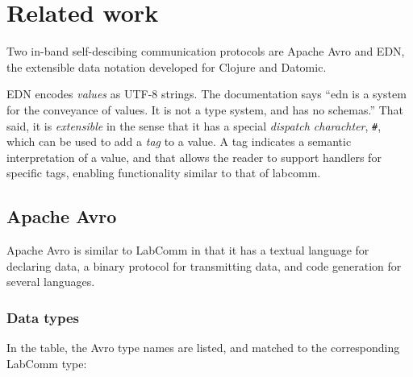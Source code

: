 \documentclass[a4paper]{article}
\begin{document}
\section{Related work}
  
Two in-band self-descibing communication protocols are Apache
Avro\cite{avro} and EDN, the extensible data notation developed for
Clojure and Datomic\cite{EDN}.

EDN encodes \emph{values} as UTF-8 strings. The documentation says
``edn is a system for the conveyance of values. It is not a type system,
and has no schemas.'' That said, it is \emph{extensible} in the sense
that it has a special \emph{dispatch charachter}, \verb+#+, which can  
be used to add a \emph{tag} to a value. A tag indicates a semantic
interpretation of a value, and that allows the reader to support
handlers for specific tags, enabling functionality similar to that of
labcomm.

\subsection{Apache Avro}

Apache Avro is similar to LabComm in that it has a textual language
for declaring data, a binary protocol for transmitting data, and code
generation for several languages.

\subsubsection*{Data types} 

In the table, the Avro type names are listed, and matched to the
corresponding LabComm type:
\end{document}
